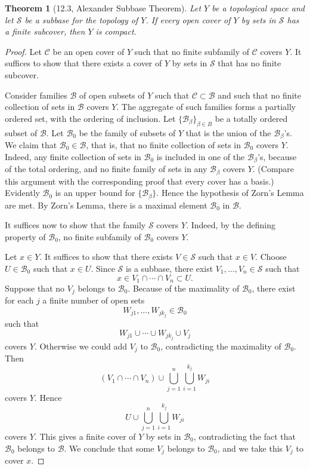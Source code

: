 \documentclass[12pt]{article}
\newtheorem{theorem}{Theorem}
\begin{document}
\begin{theorem}[12.3, Alexander Subbase Theorem]
Let $Y$ be a topological space and let $\mathcal{S}$ be a subbase for the topology of $Y$. If every open cover of $Y$ by sets in $\mathcal{S}$ has a finite subcover, then $Y$ is compact.
\end{theorem}

\begin{proof}
Let $\mathcal{C}$ be an open cover of $Y$ such that no finite subfamily of $\mathcal{C}$ covers $Y$. It suffices to show that there exists a cover of $Y$ by sets in $\mathcal{S}$ that has no finite subcover.

Consider families $\mathcal{B}$ of open subsets of $Y$ such that $\mathcal{C} \subset \mathcal{B}$ and such that no finite collection of sets in $\mathcal{B}$ covers $Y$. The aggregate of such families forms a partially ordered set, with the ordering of inclusion. Let $\{\mathcal{B}_\beta\}_{\beta\in B}$ be a totally ordered subset of $\mathcal{B}$. Let $\mathcal{B}_0$ be the family of subsets of $Y$ that is the union of the $\mathcal{B}_\beta$’s. We claim that $\mathcal{B}_0 \in \mathcal{B}$, that is, that no finite collection of sets in $\mathcal{B}_0$ covers $Y$. Indeed, any finite collection of sets in $\mathcal{B}_0$ is included in one of the $\mathcal{B}_\beta$’s, because of the total ordering, and no finite family of sets in any $\mathcal{B}_\beta$ covers $Y$. (Compare this argument with the corresponding proof that every cover has a basis.) Evidently $\mathcal{B}_0$ is an upper bound for $\{\mathcal{B}_\beta\}$. Hence the hypothesis of Zorn’s Lemma are met. By Zorn’s Lemma, there is a maximal element $\mathcal{B}_0$ in $\mathcal{B}$.

It suffices now to show that the family $\mathcal{S}$ covers $Y$. Indeed, by the defining property of $\mathcal{B}_0$, no finite subfamily of $\mathcal{B}_0$ covers $Y$.

Let $x \in Y$. It suffices to show that there exists $V \in \mathcal{S}$ such that $x \in V$. Choose $U \in \mathcal{B}_0$ such that $x \in U$. Since $\mathcal{S}$ is a subbase, there exist $V_1,\dots,V_n \in \mathcal{S}$ such that
\[
x \in V_1 \cap \cdots \cap V_n \subset U.
\]
Suppose that no $V_j$ belongs to $\mathcal{B}_0$. Because of the maximality of $\mathcal{B}_0$, there exist for each $j$ a finite number of open sets
\[
W_{j1},\dots,W_{jk_j} \in \mathcal{B}_0
\]
such that
\[
W_{j1} \cup \cdots \cup W_{jk_j} \cup V_j
\]
covers $Y$. Otherwise we could add $V_j$ to $\mathcal{B}_0$, contradicting the maximality of $\mathcal{B}_0$. Then
\[
(V_1 \cap \cdots \cap V_n) \cup \bigcup_{j=1}^n \bigcup_{i=1}^{k_j} W_{ji}
\]
covers $Y$. Hence
\[
U \cup \bigcup_{j=1}^n \bigcup_{i=1}^{k_j} W_{ji}
\]
covers $Y$. This gives a finite cover of $Y$ by sets in $\mathcal{B}_0$, contradicting the fact that $\mathcal{B}_0$ belongs to $\mathcal{B}$. We conclude that some $V_j$ belongs to $\mathcal{B}_0$, and we take this $V_j$ to cover $x$.
\end{proof}
\end{document}
